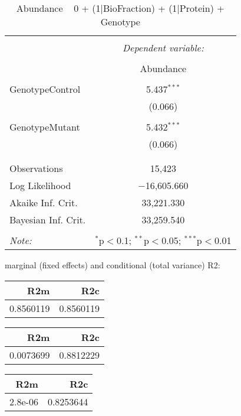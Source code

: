 \documentclass[11pt]{report}
\begin{document}
\begin{table}[!htbp] \centering 
  \caption{Abundance ~ 0 + (1|BioFraction) + (1|Protein) + Genotype} 
  \label{} 
\begin{tabular}{@{\extracolsep{5pt}}lc} 
\\[-1.8ex]\hline 
\hline \\[-1.8ex] 
 & \multicolumn{1}{c}{\textit{Dependent variable:}} \\ 
\cline{2-2} 
\\[-1.8ex] & Abundance \\ 
\hline \\[-1.8ex] 
 GenotypeControl & 5.437$^{***}$ \\ 
  & (0.066) \\ 
  & \\ 
 GenotypeMutant & 5.432$^{***}$ \\ 
  & (0.066) \\ 
  & \\ 
\hline \\[-1.8ex] 
Observations & 15,423 \\ 
Log Likelihood & $-$16,605.660 \\ 
Akaike Inf. Crit. & 33,221.330 \\ 
Bayesian Inf. Crit. & 33,259.540 \\ 
\hline 
\hline \\[-1.8ex] 
\textit{Note:}  & \multicolumn{1}{r}{$^{*}$p$<$0.1; $^{**}$p$<$0.05; $^{***}$p$<$0.01} \\ 
\end{tabular} 
\end{table} 
marginal (fixed effects) and conditional (total variance) R2:

\begin{tabular}{r|r}
\hline
R2m & R2c\\
\hline
0.8560119 & 0.8560119\\
\hline
\end{tabular}

\begin{tabular}{r|r}
\hline
R2m & R2c\\
\hline
0.0073699 & 0.8812229\\
\hline
\end{tabular}

\begin{tabular}{r|r}
\hline
R2m & R2c\\
\hline
2.8e-06 & 0.8253644\\
\hline
\end{tabular}
\end{document}
